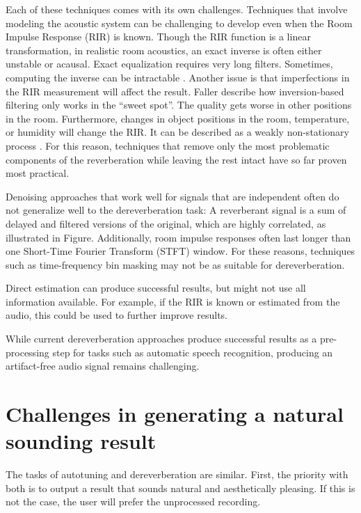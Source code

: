 Each of these techniques comes with its own challenges. Techniques that involve modeling the acoustic system can be challenging to develop even when the Room Impulse Response (RIR) is known. Though the RIR function is a linear transformation, in realistic room acoustics, an exact inverse is often either unstable or acausal. Exact equalization requires very long filters. Sometimes, computing the inverse can be intractable \cite{neely1979invertibility, cecchi2018room}. Another issue is that imperfections in the RIR measurement will affect the result. Faller \cite{faller2019modifying} describe how inversion-based filtering only works in the ``sweet spot''. The quality gets worse in other positions in the room. Furthermore, changes in object positions in the room, temperature, or humidity will change the RIR. It can be described as a weakly non-stationary process \cite{cecchi2018room}. For this reason, techniques that remove only the most problematic components of the reverberation while leaving the rest intact have so far proven most practical.

Denoising approaches that work well for signals that are independent often do not generalize well to the dereverberation task: A reverberant signal is a sum of delayed and filtered versions of the original, which are highly correlated, as illustrated in Figure. Additionally, room impulse responses often last longer than one Short-Time Fourier Transform (STFT) window. For these reasons, techniques such as time-frequency bin masking \cite{hershey2016deep} may not be as suitable for dereverberation.

Direct estimation can produce successful results, but might not use all information available. For example, if the RIR is known or estimated from the audio, this could be used to further improve results. 

While current dereverberation approaches produce successful results as a pre-processing step for tasks such as automatic speech recognition, producing an artifact-free audio signal remains challenging. 

\section{Challenges in generating a natural sounding result}
The tasks of autotuning and dereverberation are similar. First, the priority with both is to output a result that sounds natural and aesthetically pleasing. If this is not the case, the user will prefer the unprocessed recording. 

